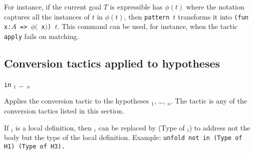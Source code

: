 For instance, if the current goal $T$ is expressible has $\phi(t)$
where the notation captures all the instances of $t$ in $\phi(t)$,
then {\tt pattern $t$} transforms it into {\tt (fun x:$A$ => $\phi(${\tt
x}$)$) $t$}.  This command can be used, for instance, when the tactic
{\tt apply} fails on matching.


\subsection{Conversion tactics applied to hypotheses}

{\convtactic} {\tt in} \ident$_1$ \dots\ \ident$_n$ 

Applies the conversion tactic {\convtactic} to the
hypotheses \ident$_1$, \ldots, \ident$_n$. The tactic {\convtactic} is
any of the conversion tactics listed in this section. 

If \ident$_i$ is a local definition, then \ident$_i$ can be replaced
by (Type of \ident$_i$) to address not the body but the type of the
local definition. Example: {\tt unfold not in (Type of H1) (Type of H3).}

